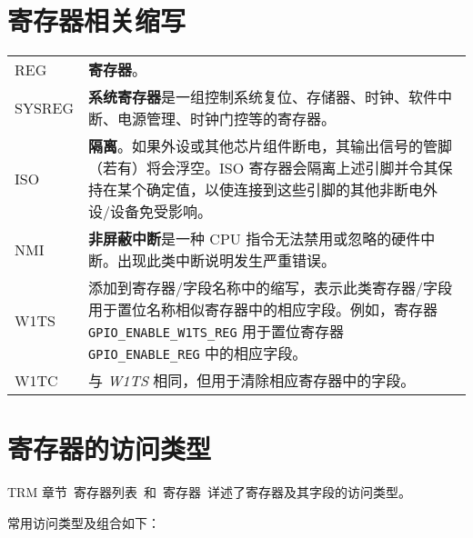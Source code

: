 
\section*{寄存器相关缩写}\label{glossary-abbr-reg}

\begin{longtable}[c]{ R{3cm} p{12cm} }

REG     & \textbf{寄存器}。 \\
SYSREG  & \textbf{系统寄存器}是一组控制系统复位、存储器、时钟、软件中断、电源管理、时钟门控等的寄存器。 \\
ISO     & \textbf{隔离}。如果外设或其他芯片组件断电，其输出信号的管脚（若有）将会浮空。ISO 寄存器会隔离上述引脚并令其保持在某个确定值，以使连接到这些引脚的其他非断电外设/设备免受影响。 \\
NMI     & \textbf{非屏蔽中断}是一种 CPU 指令无法禁用或忽略的硬件中断。出现此类中断说明发生严重错误。 \\
W1TS    & 添加到寄存器/字段名称中的缩写，表示此类寄存器/字段用于置位名称相似寄存器中的相应字段。例如，寄存器 \texttt{GPIO\_ENABLE\_W1TS\_REG} 用于置位寄存器 \texttt{GPIO\_ENABLE\_REG} 中的相应字段。 \\
W1TC    & 与 \textit{W1TS} 相同，但用于清除相应寄存器中的字段。 \\

\end{longtable}



{}
\section*{寄存器的访问类型}\label{glossary-access-types}

TRM 章节\ 寄存器列表\ 和\ 寄存器\ 详述了寄存器及其字段的访问类型。

常用访问类型及组合如下：

